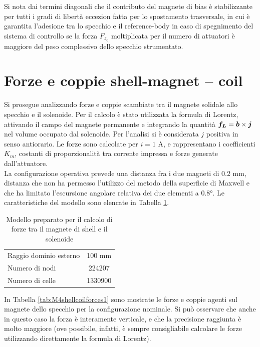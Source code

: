 Si nota dai termini diagonali che il contributo del magnete di bias è stabilizzante per tutti i gradi di libertà eccezion fatta per lo spostamento trasversale, in cui è garantita l'adesione tra lo specchio e il reference-body in caso di spegnimento del sistema di controllo se la forza $F_{z_0}$ moltiplicata per il numero di attuatori è maggiore del peso complessivo dello specchio strumentato.

\section{Forze e coppie shell-magnet -- coil}
\label{sec:shellcoilforces}
Si prosegue analizzando forze e coppie scambiate tra il magnete solidale allo specchio e il solenoide. Per il calcolo è stato utilizzata la formula di Lorentz, attivando il campo del magnete permanente e integrando la quantità $\boldsymbol{f_L} = \boldsymbol{b}\times\boldsymbol{j}$ nel volume occupato dal solenoide. Per l'analisi si è considerata $j$ positiva in senso antiorario. Le forze sono calcolate per $i  = 1$ A, e rappresentano i coefficienti $K_m$, costanti di proporzionalità tra corrente impressa e forze generate dall'attuatore.\\

La configurazione operativa prevede una distanza fra i due magneti di 0.2 mm, distanza che non ha permesso l'utilizzo del metodo della superficie di Maxwell e che ha limitato l'escursione angolare relativa dei due elementi a $0.8$°. 
Le caratteristiche del modello sono elencate in Tabella \ref{tab:M4shellcoildata}. 

\begin{table}
\centering
\caption{Modello preparato per il calcolo di forze tra il magnete di shell e il solenoide}
\label{tab:M4shellcoildata}
\begin{tabular}{lc}
\toprule
Raggio dominio esterno &  100 mm\\
Numero di nodi &  224207\\
Numero di celle & 1330900\\
\bottomrule
\end{tabular}
\end{table}

In Tabella \ref{tab:M4shellcoilforces1} sono mostrate le forze e coppie agenti sul magnete dello specchio per la configurazione nominale. Si può osservare che anche in questo caso la forza è interamente verticale, e che la precisione raggiunta è molto maggiore (ove possibile, infatti, è sempre consigliabile calcolare le forze utilizzando direttamente la formula di Lorentz).

